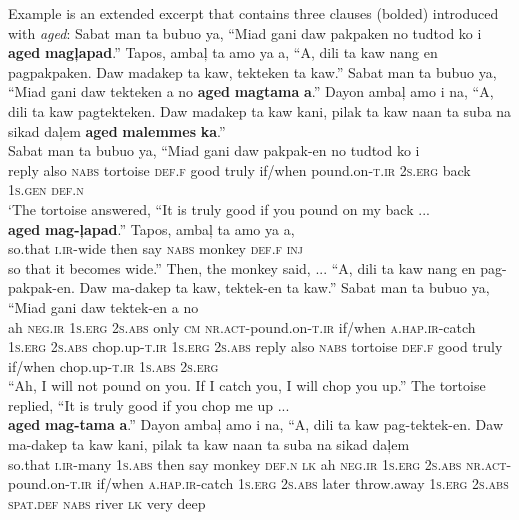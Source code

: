 Example  is an extended excerpt that contains three clauses (bolded) introduced with \textit{aged}:
\ea
\label{bkm:Ref115100547}
Sabat  man  ta  bubuo  ya,  “Miad  gani  daw  pakpaken  no tudtod  ko  i  \textbf{aged}  \textbf{magļapad}.”  Tapos,  ambaļ  ta  amo  ya  a, “A,  dili  ta kaw  nang  en  pagpakpaken.  Daw madakep  ta kaw,  tekteken  ta kaw.”  Sabat  man ta  bubuo  ya,  “Miad  gani  daw  tekteken  a  no \textbf{aged}  \textbf{magtama}  \textbf{a}.”  Dayon  ambaļ  amo  i  na, “A,  dili  ta kaw  pagtekteken.  Daw  madakep ta kaw  kani,  pilak  ta kaw  naan  ta  suba  na  sikad daļem  \textbf{aged}  \textbf{malemmes}  \textbf{ka}.” \\
    \ea
    \gll Sabat  man  ta  bubuo  ya,  “Miad  gani  daw  pakpak-en  no tudtod  ko  i \\
    reply  also  \textsc{nabs}  tortoise  \textsc{def.f}  good  truly  if/when  pound.on-\textsc{t.ir} 2\textsc{s.erg} back  1\textsc{s.gen}  \textsc{def.n} \\
    \glt `The tortoise answered, “It is truly good if you pound on my back ... \\
    \ex
    \gll \textbf{aged}  \textbf{mag-ļapad}.”  Tapos,  ambaļ  ta  amo  ya  a, \\
    so.that  \textsc{i.ir}-wide  then  say  \textsc{nabs}  monkey  \textsc{def.f}  \textsc{inj} \\
    \glt so that it becomes wide.” Then, the monkey said, ...
    \ex
    \gll “A,  dili  ta kaw  nang  en  pag-pakpak-en.  Daw ma-dakep  ta kaw,  tektek-en  ta kaw.”  Sabat  man ta  bubuo  ya,  “Miad  gani  daw  tektek-en  a  no \\
    ah  \textsc{neg.ir}  1\textsc{s.erg} 2\textsc{s.abs}  only  \textsc{cm}  \textsc{nr.act}-pound.on-\textsc{t.ir}  if/when \textsc{a.hap.ir}-catch  1\textsc{s.erg} 2\textsc{s.abs} chop.up-\textsc{t.ir}  1\textsc{s.erg} 2\textsc{s.abs}  reply  also \textsc{nabs}  tortoise  \textsc{def.f}  good  truly  if/when  chop.up-\textsc{t.ir}  1\textsc{s.abs}  2\textsc{s.erg} \\
    \glt “Ah, I will not pound on you. If I catch you, I will chop you up.” The tortoise replied, “It is truly good if you chop me up ... \\
    \ex
    \gll \textbf{aged}  \textbf{mag-tama}  \textbf{a}.”  Dayon  ambaļ  amo  i  na, “A,  dili  ta kaw  pag-tektek-en.  Daw  ma-dakep ta kaw  kani,  pilak  ta kaw  naan  ta  suba  na  sikad daļem \\
    so.that  \textsc{i.ir}-many  1\textsc{s.abs}  then  say  monkey  \textsc{def.n}  \textsc{lk} ah  \textsc{neg.ir}  1\textsc{s.erg} 2\textsc{s.abs}  \textsc{nr.act}-pound.on-\textsc{t.ir}  if/when  \textsc{a.hap.ir}-catch 1\textsc{s.erg} 2\textsc{s.abs} later  throw.away\textsc{} 1\textsc{s.erg} 2\textsc{s.abs}  \textsc{spat.def}  \textsc{nabs} river \textsc{lk} very deep \\
